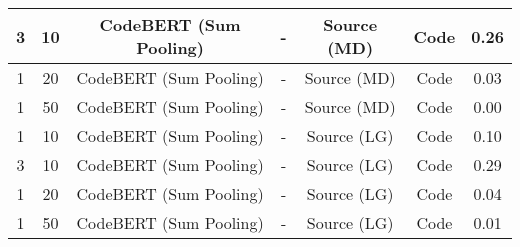 \begin{longtable}{|c|c|c|c|c|c|c|}
\hline
3 & 10 & CodeBERT (Sum Pooling) & - & Source (MD) & Code & 0.26 \\
\hline
1 & 20 & CodeBERT (Sum Pooling) & - & Source (MD) & Code & 0.03 \\
\hline
1 & 50 & CodeBERT (Sum Pooling) & - & Source (MD) & Code & 0.00 \\
\hline
1 & 10 & CodeBERT (Sum Pooling) & - & Source (LG) & Code & 0.10 \\
\hline
3 & 10 & CodeBERT (Sum Pooling) & - & Source (LG) & Code & 0.29 \\
\hline
1 & 20 & CodeBERT (Sum Pooling) & - & Source (LG) & Code & 0.04 \\
\hline
1 & 50 & CodeBERT (Sum Pooling) & - & Source (LG) & Code & 0.01 \\
\hline
\end{longtable}
